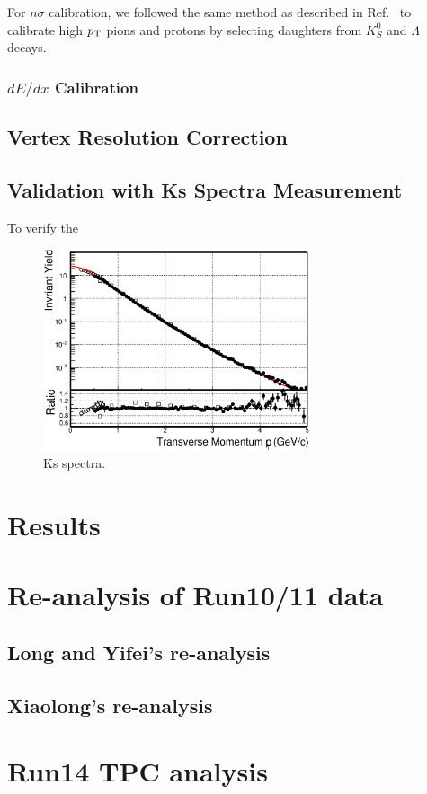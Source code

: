 \documentclass[a4paper]{article}
\begin{document}
For $n\sigma$ calibration, we followed the same method as described in Ref.~\cite{Xu:2008th} to calibrate high $p_{\rm T}$ pions and protons by selecting daughters from $K_{S}^0$ and $\Lambda$ decays.

\subsubsection{$dE/dx$ Calibration}



\subsection{Vertex Resolution Correction}

\subsection{Validation with Ks Spectra Measurement}

To verify the 

\begin{figure}
\centering
\includegraphics[width=0.7\textwidth]{fig/Ks_spectra_PtCut_0.eps}
\caption{\label{fig:Ks_spectra}Ks spectra.}
\end{figure}

\section{\label{results}Results}

\section{\label{Run1011}Re-analysis of Run10/11 data}

\subsection{Long and Yifei's re-analysis}

\subsection{Xiaolong's re-analysis}

\section{\label{Run14TPC}Run14 TPC analysis}



\end{document}
